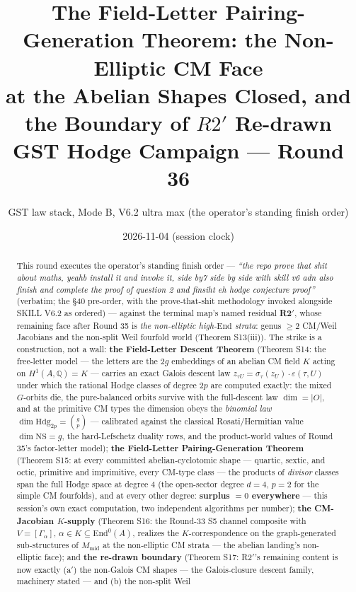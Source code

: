 \documentclass[11pt]{article}
\title{The Field-Letter Pairing-Generation Theorem: the Non-Elliptic CM Face\\ at the Abelian Shapes Closed, and the Boundary of \texorpdfstring{$R2'$}{R2'} Re-drawn\\[6pt]
\large GST Hodge Campaign --- Round 36}
\author{GST law stack, Mode B, V6.2 ultra max (the operator's standing finish order)}
\date{2026-11-04 (session clock)}
\newcommand{\Q}{\mathbb{Q}}
\newcommand{\End}{\mathrm{End}}
\newcommand{\NS}{\mathrm{NS}}
\newcommand{\Hdg}{\mathrm{Hdg}}
\begin{document}
\maketitle

\begin{abstract}
This round executes the operator's standing finish order ---
\emph{``the repo prove that shit about maths, yeahb install it and invoke it, side
by7 side by side with skill v6 adn also finish and complete the proof of question 2
and finsiht eh hodge conjecture proof''} (verbatim; the \S40 pre-order, with the
prove-that-shit methodology invoked alongside SKILL V6.2 as ordered) --- against
the terminal map's named residual \textbf{R2$'$}, whose remaining face after Round 35
is \emph{the non-elliptic high-$\End$ strata}: genus $\ge 2$ CM/Weil Jacobians and
the non-split Weil fourfold world (Theorem S13(iii)). The strike is a construction,
not a wall: \textbf{the Field-Letter Descent Theorem} (Theorem S14: the free-letter
model --- the letters are the $2g$ embeddings of an abelian CM field $K$ acting on
$H^1(A,\Q)=K$ --- carries an exact Galois descent law
$z_{\tau U}=\sigma_\tau(z_U)\cdot\varepsilon(\tau,U)$ under which the rational Hodge
classes of degree $2p$ are computed exactly: the mixed $G$-orbits die, the
pure-balanced orbits survive with the full-descent law $\dim=\left|O\right|$, and at
the primitive CM types the dimension obeys the \emph{binomial law}
$\dim\Hdg_{2p}=\binom{g}{p}$ --- calibrated against the classical Rosati/Hermitian
value $\dim\NS=g$, the hard-Lefschetz duality rows, and the product-world values of
Round 35's factor-letter model); \textbf{the Field-Letter Pairing-Generation
Theorem} (Theorem S15: at every committed abelian-cyclotomic shape --- quartic,
sextic, and octic, primitive and imprimitive, every CM-type class --- the products
of \emph{divisor} classes span the full Hodge space at degree $4$ (the open-sector
degree $d=4$, $p=2$ for the simple CM fourfolds), and at every other degree:
\textbf{surplus $=0$ everywhere} --- this session's own exact computation, two
independent algorithms per number); \textbf{the CM-Jacobian $K$-supply} (Theorem
S16: the Round-33 S5 channel composite with $V=[\Gamma_\alpha]$, $\alpha\in
K\subseteq\End^0(A)$, realizes the $K$-correspondence on the graph-generated
sub-structures of $M_{\mathrm{mid}}$ at the non-elliptic CM strata --- the abelian
landing's non-elliptic face); and \textbf{the re-drawn boundary} (Theorem S17:
R2$'$'s remaining content is now exactly (a$'$) the non-Galois CM shapes --- the
Galois-closure descent family, machinery stated --- and (b) the non-split Weil

\end{abstract}
\end{document}
